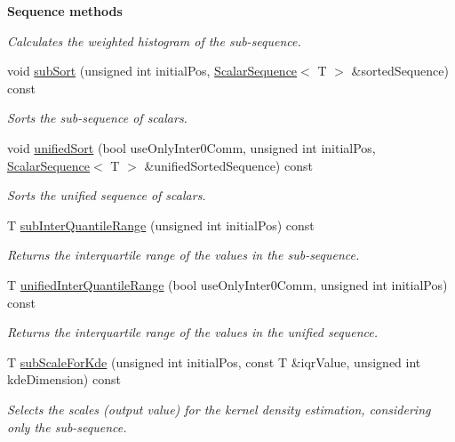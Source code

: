\begin{Indent}{\bf Sequence methods}
\begin{DoxyCompactItemize}
\begin{DoxyCompactList}\small\item\em Calculates the weighted histogram of the sub-\/sequence. \end{DoxyCompactList}\item 
void \hyperlink{class_q_u_e_s_o_1_1_scalar_sequence_a4991e998cb5058457978b22ed1c90eb4}{sub\-Sort} (unsigned int initial\-Pos, \hyperlink{class_q_u_e_s_o_1_1_scalar_sequence}{Scalar\-Sequence}$<$ T $>$ \&sorted\-Sequence) const 
\begin{DoxyCompactList}\small\item\em Sorts the sub-\/sequence of scalars. \end{DoxyCompactList}\item 
void \hyperlink{class_q_u_e_s_o_1_1_scalar_sequence_a8a77f546238c4b419d926a0c76613cd8}{unified\-Sort} (bool use\-Only\-Inter0\-Comm, unsigned int initial\-Pos, \hyperlink{class_q_u_e_s_o_1_1_scalar_sequence}{Scalar\-Sequence}$<$ T $>$ \&unified\-Sorted\-Sequence) const 
\begin{DoxyCompactList}\small\item\em Sorts the unified sequence of scalars. \end{DoxyCompactList}\item 
T \hyperlink{class_q_u_e_s_o_1_1_scalar_sequence_a0bde4bf373cbe6d6245b1ef8693e6053}{sub\-Inter\-Quantile\-Range} (unsigned int initial\-Pos) const 
\begin{DoxyCompactList}\small\item\em Returns the interquartile range of the values in the sub-\/sequence. \end{DoxyCompactList}\item 
T \hyperlink{class_q_u_e_s_o_1_1_scalar_sequence_a8cc1ea6318342927b392cd8fd52696bb}{unified\-Inter\-Quantile\-Range} (bool use\-Only\-Inter0\-Comm, unsigned int initial\-Pos) const 
\begin{DoxyCompactList}\small\item\em Returns the interquartile range of the values in the unified sequence. \end{DoxyCompactList}\item 
T \hyperlink{class_q_u_e_s_o_1_1_scalar_sequence_a4d71b54cc40395677bb744d8b540dad5}{sub\-Scale\-For\-Kde} (unsigned int initial\-Pos, const T \&iqr\-Value, unsigned int kde\-Dimension) const 
\begin{DoxyCompactList}\small\item\em Selects the scales (output value) for the kernel density estimation, considering only the sub-\/sequence. \end{DoxyCompactList}\item 

\end{DoxyCompactItemize}
\end{Indent}
